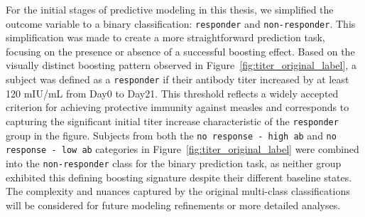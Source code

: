 \documentclass[12pt,a4paper]{report}
\begin{document}
For the initial stages of predictive modeling in this thesis, we simplified the outcome variable to a binary classification: \texttt{responder} and \texttt{non-responder}. This simplification was made to create a more straightforward prediction task, focusing on the presence or absence of a successful boosting effect. Based on the visually distinct boosting pattern observed in Figure~\ref{fig:titer_original_label}, a subject was defined as a \texttt{responder} if their antibody titer increased by at least 120 mIU/mL from Day0 to Day21. This threshold reflects a widely accepted criterion for achieving protective immunity against measles \cite{chen1990measles} and corresponds to capturing the significant initial titer increase characteristic of the \texttt{responder} group in the figure. Subjects from both the \texttt{no response - high ab} and \texttt{no response - low ab} categories in Figure~\ref{fig:titer_original_label} were combined into the \texttt{non-responder} class for the binary prediction task, as neither group exhibited this defining boosting signature despite their different baseline states. The complexity and nuances captured by the original multi-class classifications will be considered for future modeling refinements or more detailed analyses.















\end{document}
